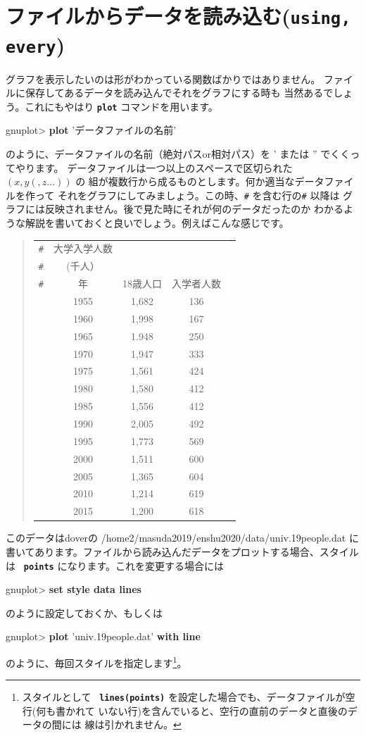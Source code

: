 \documentclass[a4j]{ujarticle} %
\newenvironment{terminal}{%
  \begin{center}
   \begin{minipage}{.8\textwidth}
    \setlength{\FrameSep}{.5\FrameSep}%
    \begin{framed}\ttfamily\small%
     \setlength\baselineskip{.85\baselineskip}%
}{%
    \end{framed}
   \end{minipage}
  \end{center}%
}
\begin{document}
\section{ファイルからデータを読み込む({\tt\bf using, every})}
グラフを表示したいのは形がわかっている関数ばかりではありません。
ファイルに保存してあるデータを読み込んでそれをグラフにする時も
当然あるでしょう。これにもやはり {\tt\bf plot} コマンドを用います。
\begin{terminal}
gnuplot> {\bf plot} 'データファイルの名前'
\end{terminal}
のように、データファイルの名前（絶対パスor相対パス）を ' または '' でくくってやります。
データファイルは一つ以上のスペースで区切られた $(x,y(,z...))$ の
組が複数行から成るものとします。何か適当なデータファイルを作って
それをグラフにしてみましょう。この時、{\tt \#} を含む行の{\tt \#} 以降は
グラフには反映されません。後で見た時にそれが何のデータだったのか
わかるような解説を書いておくと良いでしょう。例えばこんな感じです。
\begin{quote}
 \renewcommand{\arraystretch}{0.7}
\begin{tabular}{lcccc}
{\tt \#} & 大学入学人数 & & & \\
{\tt \#} & (千人） & & & \\
{\tt \#} & 年 & 18歳人口 & 入学者人数\\
&  1955 & 1,682 & 136 \\
&  1960 & 1,998 & 167 \\
&  1965 & 1.948 & 250 \\
&  1970 & 1,947 & 333 \\
&  1975 & 1,561 & 424 \\
&  1980 & 1,580 & 412 \\
&  1985 & 1,556 & 412 \\
&  1990 & 2,005 & 492 \\
&  1995 & 1,773 & 569 \\
&  2000 & 1,511 & 600 \\
&  2005 & 1,365 & 604 \\
&  2010 & 1,214 & 619 \\
&  2015 & 1,200 & 618 \\
\end{tabular}
\end{quote}

このデータはdoverの /home2/masuda2019/enshu2020/data/univ.19people.dat に書いてあります。ファイルから読み込んだデータをプロットする場合、スタイルは {\bf\tt
points} になります。これを変更する場合には
\begin{terminal}
gnuplot> {\bf set style data lines}
\end{terminal}
のように設定しておくか、もしくは
\begin{terminal}
gnuplot> {\bf plot} 'univ.19people.dat' {\bf with line}
\end{terminal}
のように、毎回スタイルを指定します\footnote{スタイルとして {\bf\tt
lines(points)} を設定した場合でも、データファイルが空行(何も書かれて
いない行)を含んでいると、空行の直前のデータと直後のデータの間には
線は引かれません。}。
\end{document}
